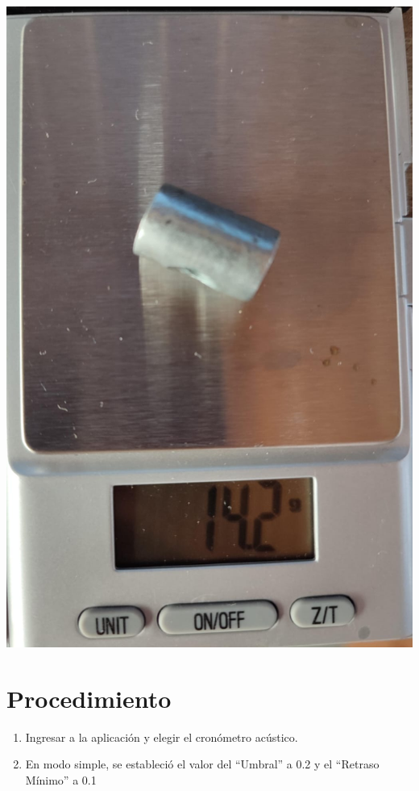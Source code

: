\begin{multicols}{2}
    \begin{center}
        \includegraphics[scale=0.05]{fig/pieza-metalica.png}
    \end{center}

\section*{Procedimiento}
\begin{enumerate}
    \item Ingresar a la aplicación y elegir el cronómetro acústico.

    \item En modo simple, se estableció el valor del “Umbral” a 0.2 y el “Retraso Mínimo” a 0.1
    

\end{enumerate}
\end{multicols}
